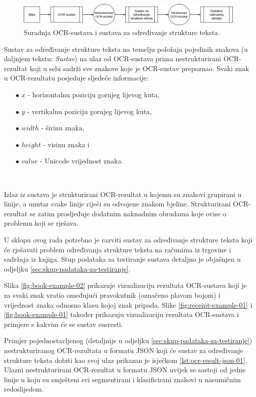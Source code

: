 \documentclass[times, utf8, zavrsni]{fer}
\begin{document}
\

\begin{figure}[htb]
    \centering
    \includegraphics[width=\textwidth]{images/sustav-01.png}
    \caption{Suradnja OCR-sustava i sustava za određivanje strukture teksta.}
    \label{fig:sustav-01}
\end{figure}

Sustav za određivanje strukture teksta na temelju položaja pojedinih znakova
(u daljnjem tekstu: \emph{Sustav}) na ulaz od OCR-sustava prima
nestrukturirani OCR-rezultat koji u sebi sadrži sve znakove koje je OCR-sustav
prepoznao. Svaki znak u OCR-rezultatu posjeduje sljedeće informacije:
\begin{itemize}
    \item[$\bullet$] $x$ - horizontalnu poziciju gornjeg lijevog kuta,
    \item[$\bullet$] $y$ - vertikalnu poziciju gornjeg lijevog kuta,
    \item[$\bullet$] $width$ - širinu znaka,
    \item[$\bullet$] $height$ - visinu znaka i
    \item[$\bullet$] $value$ - Unicode vrijednost znaka.
\end{itemize}

\

Izlaz iz sustava je strukturirani OCR-rezultat u kojemu su znakovi
grupirani u linije, a unutar svake linije riječi su odvojene znakom
bjeline. Strukturirani OCR-rezultat se zatim prosljeđuje dodatnim naknadnim
obradama koje ovise o problemu koji se rješava.

U sklopu ovog rada potrebno je razviti sustav za određivanje strukture
teksta koji će rješavati problem određivanja strukture teksta na računima iz
trgovine i sadržaja iz knjiga. Stup podataka za testiranje
sustava detaljno je objašnjen u odjeljku \ref{sec:skup-padataka-za-testiranje}.

Slika \ref{fig:book-example-02} prikazuje vizualizaciju rezultata OCR-sustava
koji je za svaki znak vratio omeđujući pravokutnik (označeno plavom bojom) i
vrijednost znaka odnosno klasu kojoj znak pripada.
Slike \ref{fig:receipt-example-01} i \ref{fig:book-example-01} također prikazuju
vizualizaciju rezultata OCR-sustava i primjere s kakvim će se sustav susresti.

Primjer pojednostavljenog (detaljnije u odjeljku
\ref{sec:skup-padataka-za-testiranje}) nestrukturiranog OCR-rezultata u formatu
JSON koji će sustav za određivanje strukture teksta dobiti kao svoj ulaz
prikazan je isječkom \ref{lst:ocr-result-json-01}. Ulazni nestrukturirani
OCR-rezultat u formatu JSON uvijek se sastoji od jedne linije u koju
su smješteni svi segmentirani i klasificirani znakovi u nasumičnim redoslijedom.
\end{document}
